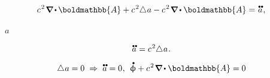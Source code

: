 \begin{gather*}
c^{\hspace{.16ex}2} \hspace{.22ex} \boldnabla \hspace{-0.12ex} \dotp \hspace{-0.12ex} \boldmathbb{A} + c^{\hspace{.16ex}2} \hspace{-0.4ex} \Laplacian \hspace{.07ex} a
- c^{\hspace{.16ex}2} \hspace{.22ex} \boldnabla \hspace{-0.1ex} \dotp \boldmathbb{A} = \hspace{.15ex} \mathdotdotabove{a}
\hspace{.16ex} ,
\end{gather*}

\vspace{-0.16em} \noindent {}  \href{https://en.wikipedia.org/wiki/Wave_equation}{} ~$a$

\nopagebreak\vspace{-0.12em}\begin{equation}\label{gaugeadditioniswave}
\mathdotdotabove{a} \hspace{.1ex} = c^{\hspace{.16ex}2} \hspace{-0.4ex} \Laplacian \hspace{.07ex} a
\hspace{.16ex} .
\end{equation}

\vspace{-0.15em}\noindent
{} \ru{\:---}  

\nopagebreak\vspace{-0.1em}\begin{equation*}
\Laplacian \hspace{.07ex} a = 0
\hspace{.3em} \Rightarrow \hspace{.3em}
\mathdotdotabove{a} = 0
\hspace{.1ex} , \:\:
\mathdotabove{\upphi} + c^{\hspace{.16ex}2} \hspace{.22ex} \boldnabla \hspace{-0.1ex} \dotp \boldmathbb{A} = 0
\end{equation*}

